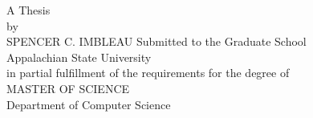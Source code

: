 \vspace*{0.5in}
\vfill
\begin{center}
\begin{spacing}{1.1}
\begin{adjustwidth}{2cm}{2cm}
\begin{center}
\large{\thesistitle}
\end{center}
\end{adjustwidth}
\end{spacing}
\normalsize
\vfill
A Thesis\\
by\\
SPENCER C. IMBLEAU
\vfill
Submitted to the Graduate School\\
Appalachian State University\\
in partial fulfillment of the requirements for the degree of\\
MASTER OF SCIENCE
\vfill
\graduationdate\\
Department of Computer Science
\end{center}
\vfill

\clearpage